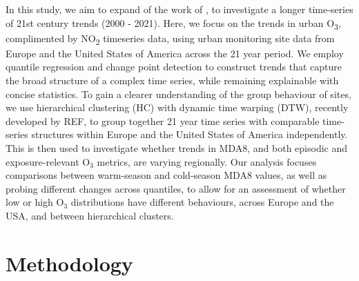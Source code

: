 \documentclass[journal abbreviation, manuscript]{copernicus}
\begin{document}

In this study, we aim to expand of the work of \cite{fleming_2018}, to investigate a longer time-series of 21st century trends (2000 - 2021). Here, we focus on the trends in urban O\textsubscript{3}, complimented by NO\textsubscript{2} timeseries data, using urban monitoring site data from Europe and the United States of America across the 21 year period. We employ quantile regression and change point detection to construct trends that capture the broad structure of a complex time series, while remaining explainable with concise statistics. To gain a clearer understanding of the group behaviour of sites, we use hierarchical clustering (HC) with dynamic time warping (DTW), recently developed by REF, to group together 21 year time series with comparable time-series structures within Europe and the United States of America independently. This is then used to investigate whether trends in MDA8, and both episodic and exposure-relevant O$_3$ metrics, are varying regionally. Our analysis focuses comparisons between warm-season and cold-season MDA8 values, as well as probing different changes across quantiles, to allow for an assessment of whether low or high O$_3$ distributions have different behaviours, across Europe and the USA, and between hierarchical clusters.

\section{Methodology} \label{sect:method}
\end{document}
